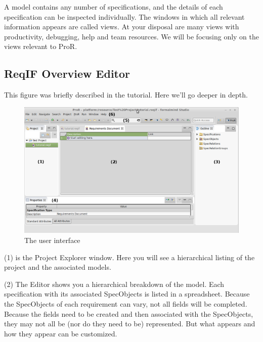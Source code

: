 A model contains any number of specifications, and the details of each specification can be inspected individually.  The windows in which all relevant information appears are called views.  At your disposal are many views with productivity, debugging, help and team resources.  We will be focusing only on the views relevant to ProR.

\subsection{ReqIF Overview Editor}

This figure was briefly described in the tutorial.  Here we'll go deeper in depth.

\begin{figure}[h!]
  \centering
  \includegraphics[width=\linewidth]{../rmf-images/Screenshot_intro.png}
  \caption{The \pror{} user interface}
  \label{fig:user_interface_overview}
\end{figure}

(1) is the Project Explorer window.  Here you will see a hierarchical listing of the project and the associated models.

(2) The Editor shows you a hierarchical breakdown of the model.  Each specification with its associated SpecObjects is listed in a spreadsheet.  Because the SpecObjects of each requirement can vary, not all fields will be completed.  Because the fields need to be created and then associated with the SpecObjects, they may not all be (nor do they need to be) represented.  But what appears and how they appear can be customized.

